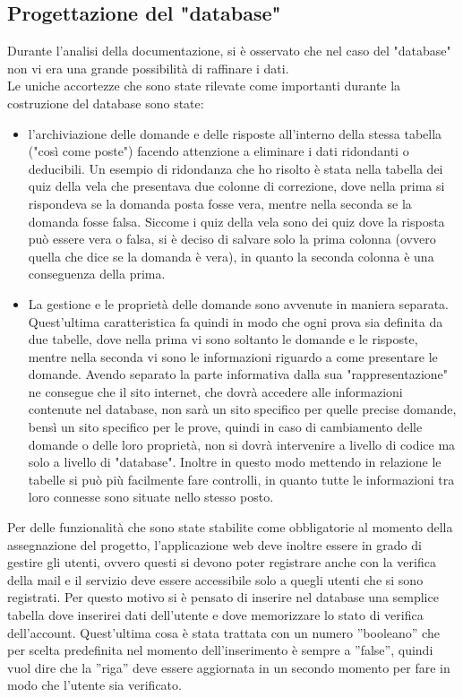 \subsection{Progettazione del "database"}
\raggedright
Durante l'analisi della documentazione, si è osservato che nel caso del "database" non vi era una grande possibilità di raffinare i dati.\\
Le uniche accortezze che sono state rilevate come importanti durante la costruzione del database sono state:
\begin{itemize}
	\item l'archiviazione delle domande e delle risposte all'interno della stessa tabella ("così come poste") facendo attenzione a eliminare i dati ridondanti o deducibili. Un esempio di ridondanza che ho risolto è stata nella tabella dei quiz della vela che presentava due colonne di correzione, dove nella prima si rispondeva se la domanda posta fosse vera, mentre nella seconda se la domanda fosse falsa. Siccome i quiz della vela sono dei quiz dove la risposta può essere vera o falsa, si è deciso di salvare solo la prima colonna (ovvero quella che dice se la domanda è vera), in quanto la seconda colonna è una conseguenza della prima. 
	
	\item La gestione e le proprietà delle domande sono avvenute in maniera separata. Quest'ultima caratteristica fa quindi in modo che ogni prova sia definita da due tabelle, dove nella prima vi sono soltanto le domande e le risposte, mentre nella seconda vi sono le informazioni riguardo a come presentare le domande. Avendo separato la parte informativa dalla sua "rappresentazione" ne consegue che il sito internet, che dovrà accedere alle informazioni contenute nel database, non sarà un sito specifico per quelle precise domande, bensì un sito specifico per le prove, quindi in caso di cambiamento delle domande o delle loro proprietà, non si dovrà intervenire a livello di codice ma solo a livello di "database". Inoltre in questo modo mettendo in relazione le tabelle si può più facilmente fare controlli, in quanto tutte le informazioni tra loro connesse sono situate nello stesso posto.
\end{itemize}

Per delle funzionalità che sono state stabilite come obbligatorie al momento della assegnazione del progetto, l'applicazione web deve inoltre essere in grado di gestire gli utenti, ovvero questi si devono poter registrare anche con la verifica della mail e il servizio deve essere accessibile solo a quegli utenti che si sono registrati. Per questo motivo si è pensato di inserire nel database una semplice tabella dove inserirei dati dell'utente e dove memorizzare lo stato di verifica dell'account. Quest'ultima cosa è stata trattata con un numero ”booleano” che per scelta predefinita nel momento dell'inserimento è sempre a ”false”, quindi vuol dire che la ”riga” deve essere aggiornata in un secondo momento per fare in modo che l’utente sia verificato.